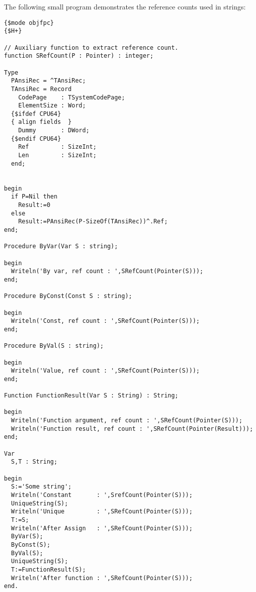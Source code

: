 The following small program demonstrates the reference counts used in strings:
\begin{verbatim}
{$mode objfpc}
{$H+}

// Auxiliary function to extract reference count.
function SRefCount(P : Pointer) : integer;

Type
  PAnsiRec = ^TAnsiRec;
  TAnsiRec = Record
    CodePage    : TSystemCodePage;
    ElementSize : Word;
  {$ifdef CPU64}
  { align fields  }
    Dummy       : DWord;
  {$endif CPU64}
    Ref         : SizeInt;
    Len         : SizeInt;
  end;
                                  

begin
  if P=Nil then
    Result:=0
  else  
    Result:=PAnsiRec(P-SizeOf(TAnsiRec))^.Ref;
end;

Procedure ByVar(Var S : string);

begin
  Writeln('By var, ref count : ',SRefCount(Pointer(S)));
end;

Procedure ByConst(Const S : string);
   
begin
  Writeln('Const, ref count : ',SRefCount(Pointer(S)));
end;

Procedure ByVal(S : string);
   
begin
  Writeln('Value, ref count : ',SRefCount(Pointer(S)));
end;

Function FunctionResult(Var S : String) : String;
   
begin
  Writeln('Function argument, ref count : ',SRefCount(Pointer(S)));
  Writeln('Function result, ref count : ',SRefCount(Pointer(Result)));
end;

Var
  S,T : String;
  
begin
  S:='Some string';
  Writeln('Constant       : ',SrefCount(Pointer(S)));
  UniqueString(S);
  Writeln('Unique         : ',SRefCount(Pointer(S)));
  T:=S;
  Writeln('After Assign   : ',SRefCount(Pointer(S)));
  ByVar(S);
  ByConst(S);
  ByVal(S);
  UniqueString(S);
  T:=FunctionResult(S);  
  Writeln('After function : ',SRefCount(Pointer(S)));
end.     
\end{verbatim}


